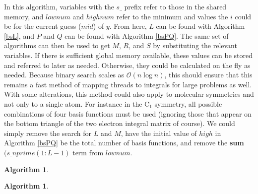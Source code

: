 \documentclass[12pt]{report}
\newtheorem{algorithm}[theorem]{Algorithm}
\begin{document}
In this algorithm, variables with the $s\_$ prefix refer to those in the shared memory, and $lownum$ and $highnum$ refer to the minimum and values the $i$ could be for the current guess ($mid$) of $y$. From here, $L$ can be found with Algorithm \ref{bsL}, and $P$ and $Q$ can be found with Algorithm \ref{bsPQ}. The same set of algorithms can then be used to get $M$, $R$, and $S$ by substituting the relevant variables. If there is sufficient global memory available, these values can be stored and referred to later as needed. Otherwise, they could be calculated on the fly as needed. Because binary search scales as $\mathcal{O}(n\log{}n)$, this should ensure that this remains a fast method of mapping threads to integrals for large problems as well. With some alterations, this method could also apply to molecular symmetries and not only to a single atom. For instance in the C$_{1}$ symmetry, all possible combinations of four basis functions must be used (ignoring those that appear on the bottom triangle of the two electron integral matrix of course). We could simply remove the search for $L$ and $M$, have the initial value of $high$ in Algorithm \ref{bsPQ} be the total number of basis functions, and remove the \textbf{sum}$(s\_nprime(1:L-1)$ term from $lownum$.

\begin{algorithm}
\caption{Binary Search for $L$}
\label{bsL}
\begin{algorithmic}

		\ENDIF
	\ENDWHILE
\ENDIF

\end{algorithmic}
\end{algorithm}

\begin{algorithm}
\caption{Binary Search for $P$ and $Q$}
\label{bsPQ}
\begin{algorithmic}

		\ENDIF
	\ENDWHILE
\ENDIF

\end{algorithmic}
\end{algorithm}
\end{document}
